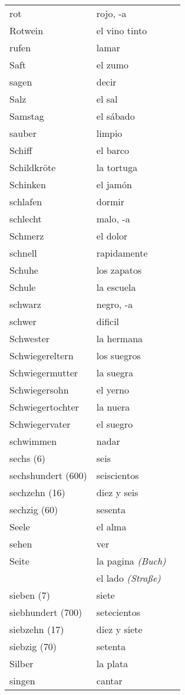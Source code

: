 \documentclass[10pt,spanish]{article}
\begin{document}
\begin{longtable}{p{} p{} | p{}}
rot & rojo, -a  \\
Rotwein & el vino tinto  \\
rufen & lamar  \\
Saft & el zumo  \\
sagen & decir  \\
Salz & el sal  \\
Samstag & el sábado  \\
sauber & limpio  \\
Schiff & el barco  \\
Schildkröte & la tortuga  \\
Schinken & el jamón \\
schlafen & dormir  \\
schlecht & malo, -a \\
Schmerz & el dolor  \\
schnell & rapidamente  \\
Schuhe & los zapatos  \\
Schule & la escuela  \\
schwarz & negro, -a  \\
schwer & dificil  \\
Schwester & la hermana  \\
Schwiegereltern & los suegros  \\
Schwiegermutter & la suegra  \\
Schwiegersohn & el yerno  \\
Schwiegertochter & la nuera  \\
Schwiegervater & el suegro  \\
schwimmen & nadar  \\
sechs (6) & seis  \\
sechshundert (600) & seiscientos   \\
sechzehn (16) & diez y seis  \\
sechzig (60) & sesenta  \\
Seele & el alma  \\
sehen & ver  \\
Seite & la pagina \textit{(Buch)} \\
& el lado \textit{(Straße)} \\
sieben (7) & siete  \\
siebhundert (700) & setecientos  \\
siebzehn (17) & diez y siete  \\
siebzig (70) & setenta  \\
Silber & la plata  \\
singen & cantar  \\

\end{longtable}
\end{document}
